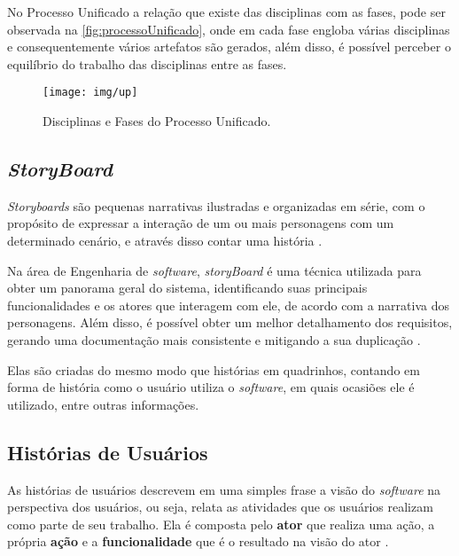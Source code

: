 No Processo Unificado a relação que existe das disciplinas com as fases, pode ser observada na \autoref{fig:processoUnificado}, onde em cada fase engloba várias disciplinas e consequentemente vários artefatos são gerados, além disso, é possível perceber o equilíbrio do trabalho das disciplinas entre as fases.

\begin{figure}[htb]
	\caption{Disciplinas e Fases do Processo Unificado.}\label{fig:processoUnificado}
	\begin{center}
		\texttt{[image: img/up]}
	\end{center}
\end{figure}


\subsection{\textit{StoryBoard}}\label{sub:storyBoard}

\textit{Storyboards} são pequenas narrativas ilustradas e organizadas em série, com o propósito de expressar a interação de um ou mais personagens com um determinado cenário, e através disso contar uma história \cite{braga2013proposta}. 

Na área de Engenharia de \textit{software}, \textit{storyBoard} é uma técnica utilizada para obter um panorama geral do sistema, identificando suas principais funcionalidades e os atores que interagem com ele, de acordo com a narrativa dos personagens. Além disso, é possível obter um melhor detalhamento dos requisitos, gerando uma documentação mais consistente e mitigando a sua duplicação \cite{storyBoardsmedeiros}.

Elas são criadas do mesmo modo que histórias em quadrinhos, contando em forma de história como o usuário utiliza o \textit{software}, em quais ocasiões ele é utilizado, entre outras informações.

\subsection{Histórias de Usuários}\label{sub:historiasUsuarios}

As histórias de usuários descrevem em uma simples frase a visão do \textit{software} na perspectiva dos usuários, ou seja, relata as atividades que os usuários realizam como parte de seu trabalho. Ela é composta pelo \textbf{ator} que realiza uma ação, a própria \textbf{ação} e a \textbf{funcionalidade} que é o resultado na visão do ator \cite{historiasUsuarios2004}.

